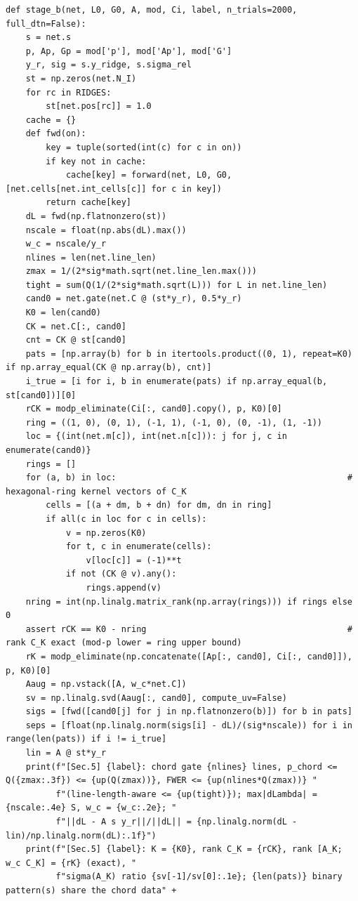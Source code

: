 \documentclass[11pt,a4paper]{article}
\theoremstyle{definition}
\theoremstyle{remark}
\begin{document}
\begin{lstlisting}
def stage_b(net, L0, G0, A, mod, Ci, label, n_trials=2000, full_dtn=False):
    s = net.s
    p, Ap, Gp = mod['p'], mod['Ap'], mod['G']
    y_r, sig = s.y_ridge, s.sigma_rel
    st = np.zeros(net.N_I)
    for rc in RIDGES:
        st[net.pos[rc]] = 1.0
    cache = {}
    def fwd(on):
        key = tuple(sorted(int(c) for c in on))
        if key not in cache:
            cache[key] = forward(net, L0, G0, [net.cells[net.int_cells[c]] for c in key])
        return cache[key]
    dL = fwd(np.flatnonzero(st))
    nscale = float(np.abs(dL).max())
    w_c = nscale/y_r
    nlines = len(net.line_len)
    zmax = 1/(2*sig*math.sqrt(net.line_len.max()))
    tight = sum(Q(1/(2*sig*math.sqrt(L))) for L in net.line_len)
    cand0 = net.gate(net.C @ (st*y_r), 0.5*y_r)
    K0 = len(cand0)
    CK = net.C[:, cand0]
    cnt = CK @ st[cand0]
    pats = [np.array(b) for b in itertools.product((0, 1), repeat=K0) if np.array_equal(CK @ np.array(b), cnt)]
    i_true = [i for i, b in enumerate(pats) if np.array_equal(b, st[cand0])][0]
    rCK = modp_eliminate(Ci[:, cand0].copy(), p, K0)[0]
    ring = ((1, 0), (0, 1), (-1, 1), (-1, 0), (0, -1), (1, -1))
    loc = {(int(net.m[c]), int(net.n[c])): j for j, c in enumerate(cand0)}
    rings = []
    for (a, b) in loc:                                              # hexagonal-ring kernel vectors of C_K
        cells = [(a + dm, b + dn) for dm, dn in ring]
        if all(c in loc for c in cells):
            v = np.zeros(K0)
            for t, c in enumerate(cells):
                v[loc[c]] = (-1)**t
            if not (CK @ v).any():
                rings.append(v)
    nring = int(np.linalg.matrix_rank(np.array(rings))) if rings else 0
    assert rCK == K0 - nring                                        # rank C_K exact (mod-p lower = ring upper bound)
    rK = modp_eliminate(np.concatenate([Ap[:, cand0], Ci[:, cand0]]), p, K0)[0]
    Aaug = np.vstack([A, w_c*net.C])
    sv = np.linalg.svd(Aaug[:, cand0], compute_uv=False)
    sigs = [fwd([cand0[j] for j in np.flatnonzero(b)]) for b in pats]
    seps = [float(np.linalg.norm(sigs[i] - dL)/(sig*nscale)) for i in range(len(pats)) if i != i_true]
    lin = A @ st*y_r
    print(f"[Sec.5] {label}: chord gate {nlines} lines, p_chord <= Q({zmax:.3f}) <= {up(Q(zmax))}, FWER <= {up(nlines*Q(zmax))} "
          f"(line-length-aware <= {up(tight)}); max|dLambda| = {nscale:.4e} S, w_c = {w_c:.2e}; "
          f"||dL - A s y_r||/||dL|| = {np.linalg.norm(dL - lin)/np.linalg.norm(dL):.1f}")
    print(f"[Sec.5] {label}: K = {K0}, rank C_K = {rCK}, rank [A_K; w_c C_K] = {rK} (exact), "
          f"sigma(A_K) ratio {sv[-1]/sv[0]:.1e}; {len(pats)} binary pattern(s) share the chord data" +

\end{lstlisting}
\end{document}
